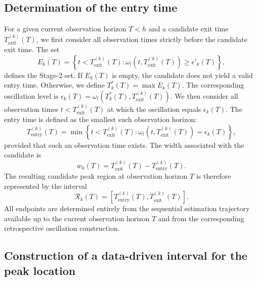 \documentclass[12pt,a4paper]{article}
\begin{document}
\subsection{Determination of the entry time}
\label{subsec:entry-time}

For a given current observation horizon \(T<h\) and a candidate exit time
\(T_{\mathrm{exit}}^{(k)}(T)\), we first consider all observation times strictly before the candidate exit time. The set
\begin{equation}
	E_k(T)
	=
	\left\{
	t<T_{\mathrm{exit}}^{(k)}(T):
	\omega_l\left(t,T_{\mathrm{exit}}^{(k)}(T)\right)
	\geq
	\epsilon'_k(T)
	\right\},
	\label{eq:stage2_set}
\end{equation}
defines the Stage-2 set. If \(E_k(T)\) is empty, the candidate does not yield a valid entry time. Otherwise, we define
\(
T_k^*(T)=\max E_k(T).
\)
The corresponding oscillation level is
\(
\epsilon_k(T)
=
\omega_l\left(
T_k^*(T),T_{\mathrm{exit}}^{(k)}(T)
\right).
\)
We then consider all observation times \(t<T_{\mathrm{exit}}^{(k)}(T)\) at which the oscillation equals \(\epsilon_k(T)\). The entry time is defined as the smallest such observation horizon:
\begin{equation}
	T_{\mathrm{entry}}^{(k)}(T)
	=
	\min
	\left\{
	t<T_{\mathrm{exit}}^{(k)}(T):
	\omega_l\left(
	t,T_{\mathrm{exit}}^{(k)}(T)
	\right)
	=
	\epsilon_k(T)
	\right\},
	\label{eq:entry-time}
\end{equation}
provided that such an observation time exists.
The width associated with the candidate is
\begin{equation}
	w_k(T)
	=
	T_{\mathrm{exit}}^{(k)}(T)
	-
	T_{\mathrm{entry}}^{(k)}(T).
	\label{eq:peak_region_width}
\end{equation}
The resulting candidate peak region at observation horizon \(T\) is therefore represented by the interval
\[
\mathcal{R}_k(T)
=
\left[
T_{\mathrm{entry}}^{(k)}(T),
T_{\mathrm{exit}}^{(k)}(T)
\right].
\]
All endpoints are determined entirely from the sequential estimation trajectory available up to the current observation horizon \(T\) and from the corresponding retrospective oscillation construction.

\subsection{Construction of a data-driven interval for the peak location}
\label{subsec:entry-exit-simulation}
\end{document}
